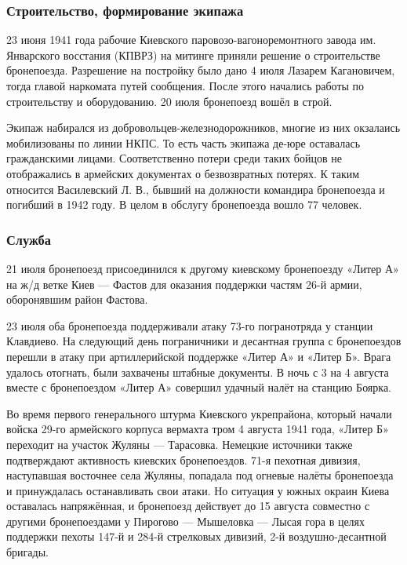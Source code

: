 \subsubsection{Строительство, формирование экипажа}

23 июня 1941 года рабочие Киевского паровозо-вагоноремонтного завода им.
Январского восстания (КПВРЗ) на митинге приняли решение о строительстве
бронепоезда. Разрешение на постройку было дано 4 июля Лазарем Кагановичем,
тогда главой наркомата путей сообщения\cite{Kolomiec100}. После этого начались работы по
строительству и оборудованию. 20 июля бронепоезд вошёл в строй\cite{Kajnaran2012,Kolomiec100}.

Экипаж набирался из добровольцев-железнодорожников, многие из них окзалаись
мобилизованы по линии НКПС. То есть часть экипажа де-юре оставалась
гражданскими лицами. Соответственно потери среди таких бойцов не отображались в
армейских документах о безвозвратных потерях. К таким относится Василевский Л.
В., бывший на должности командира бронепоезда и погибший в 1942 году. В целом в
обслугу бронепоезда вошло 77 человек\cite{Kajnaran2012}. 

\subsubsection{Служба}

21 июля бронепоезд присоединился к другому киевскому бронепоезду «Литер А» на
ж/д ветке Киев — Фастов для оказания поддержки частям 26-й армии, оборонявшим
район Фастова\cite{Kajnaran2012}.

23 июля оба бронепоезда поддерживали атаку 73-го погранотряда у станции
Клавдиево. На следующий день пограничники и десантная группа с бронепоездов
перешли в атаку при артиллерийской поддержке «Литер А» и «Литер Б». Врага
удалось отогнать, были захвачены штабные документы. В ночь с 3 на 4 августа
вместе с бронепоездом «Литер А» совершил удачный налёт на станцию
Боярка\cite{Kajnaran2012}.

Во время первого генерального штурма Киевского укрепрайона, который начали
войска 29-го армейского корпуса вермахта тром 4 августа 1941
года\cite{KajnaranMuravovJuschenko2017}, «Литер Б» переходит на участок Жуляны
— Тарасовка\cite{Kajnaran2012}. Немецкие источники также подтверждают
активность киевских бронепоездов. 71-я пехотная дивизия, наступавшая восточнее
села Жуляны, попадала под огневые налёты бронепоезда и принуждалась
останавливать свои атаки\cite{Haupt2007}. Но ситуация у южных окраин Киева
оставалась напряжённая, и бронепоезд действует до 15 августа совместно с
другими бронепоездами у Пирогово — Мышеловка — Лысая гора в целях поддержки
пехоты 147-й и 284-й стрелковых дивизий, 2-й воздушно-десантной
бригады\cite{KajnaranMuravovJuschenko2017}.

